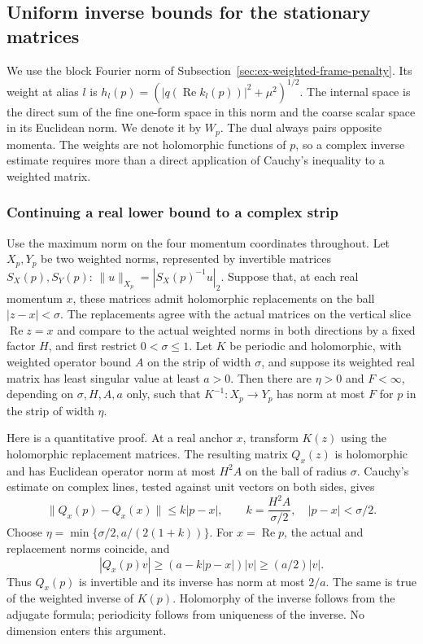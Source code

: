 \subsection{Uniform inverse bounds for the stationary matrices}
\label{sec:ex-weighted-stationary-inverses}

We use the block Fourier norm of
Subsection~\ref{sec:ex-weighted-frame-penalty}. Its weight at alias $l$ is
$h_l(p)=(|q(\operatorname{Re}k_l(p))|^2+\mu^2)^{1/2}$.
The internal space is the direct sum of the fine one-form space in this
norm and the coarse scalar space in its Euclidean norm. We denote it by
$W_p$. The dual always pairs opposite momenta. The weights are not
holomorphic functions of $p$, so a complex inverse estimate requires
more than a direct application of Cauchy's inequality to a weighted
matrix.

\subsubsection{Continuing a real lower bound to a complex strip}
Use the maximum norm on the four momentum coordinates throughout.
Let $X_p,Y_p$ be two weighted norms, represented by invertible matrices
$S_X(p),S_Y(p)$: $\|u\|_{X_p}=|S_X(p)^{-1}u|_2$.
Suppose that, at each real momentum $x$, these matrices admit holomorphic
replacements on the ball $|z-x|<\sigma$. The replacements agree with
the actual matrices on the vertical slice $\operatorname{Re}z=x$ and
compare to the actual weighted norms in both directions by a fixed
factor $H$, and first restrict $0<\sigma\leq1$. Let $K$ be periodic and holomorphic, with weighted operator
bound $A$ on the strip of width $\sigma$, and suppose its weighted real
matrix has least singular value at least $a>0$.
Then there are $\eta>0$ and $F<\infty$, depending on $\sigma,H,A,a$
only, such that $K^{-1}:X_p\to Y_p$ has norm at most $F$ for
$p$ in the strip of width $\eta$.

Here is a quantitative proof. At a real anchor $x$, transform $K(z)$
using the holomorphic replacement matrices. The resulting matrix $Q_x(z)$
is holomorphic and has Euclidean operator norm at most $H^2A$ on the
ball of radius $\sigma$. Cauchy's estimate on complex lines, tested
against unit vectors on both sides, gives
\[
       \|Q_x(p)-Q_x(x)\|\leq k|p-x|,
             \qquad k=\frac{H^2A}{\sigma/2},
             \quad |p-x|<\sigma/2.
\]
Choose $\eta=\min\{\sigma/2,a/(2(1+k))\}$. For
$x=\operatorname{Re}p$, the actual and replacement norms coincide, and
\[
       |Q_x(p)v|\geq(a-k|p-x|)|v|\geq(a/2)|v|.
\]
Thus $Q_x(p)$ is invertible and its inverse has norm at most $2/a$.
The same is true of the weighted inverse of $K(p)$. Holomorphy of the
inverse follows from the adjugate formula; periodicity follows from
uniqueness of the inverse. No dimension enters this argument.

